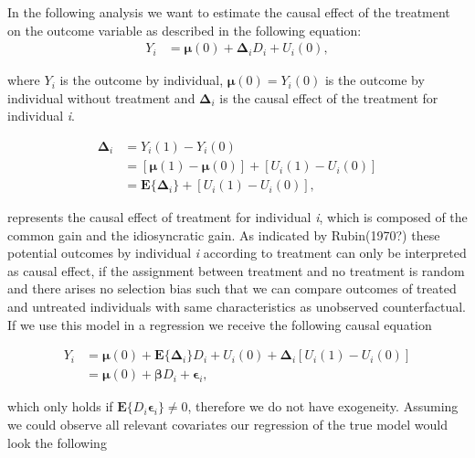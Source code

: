 In the following analysis we want to estimate the causal effect of the treatment on the outcome variable as described in the following equation: 
\begin{align}
	\label{eq:eq1}
	\textit{Y}_i &= \boldsymbol{\mu}(0) + \boldsymbol{\Delta}_i \textit{D}_i + \textit{U}_i(0),
\end{align}

where $\textit{Y}_i$ is the outcome by individual, $\boldsymbol{\mu}(0) = \textit{Y}_i(0)$ is the outcome by individual without treatment and $\boldsymbol{\Delta}_i$ is the causal effect of the treatment  for individual \textit{i}.

\begin{equation}
  \begin{aligned}
	\label{eq:eq2}
	\boldsymbol{\Delta}_i &= \textit{Y}_i(1) - \textit{Y}_i(0) \\
						 &= [\boldsymbol{\mu}(1)- \boldsymbol{\mu}(0)] + [\textit{U}_i(1)-\textit{U}_i(0)] \\
						 &= \boldsymbol{E} \{ \boldsymbol{\Delta}_i \} + [\textit{U}_i(1)-\textit{U}_i(0)],
  \end{aligned}
\end{equation}
  

represents the causal effect of treatment for individual \textit{i}, which is composed of the common gain and the idiosyncratic gain. As indicated by Rubin(1970?) these potential outcomes by individual \textit{i} according to treatment can only be interpreted as causal effect, if the assignment between treatment and no treatment is random and there arises no selection bias such that we can compare outcomes of treated and untreated individuals with same characteristics as unobserved counterfactual. If we use this model in a regression we receive the following causal equation

\begin{equation}
  \begin{aligned}
	\label{eq:eq3}
	\textit{Y}_i &= \boldsymbol{\mu}(0) + \boldsymbol{E} \{ \boldsymbol{\Delta}_i \} \textit{D}_i + \textit{U}_i(0) + \boldsymbol{\Delta}_i[\textit{U}_i(1)-\textit{U}_i(0)] \\
				 &= \boldsymbol{\mu}(0) + \boldsymbol{\beta} \textit{D}_i + \boldsymbol{\epsilon}_i,
  \end{aligned}
\end{equation}
  
which only holds if $\boldsymbol{E}\{\textit{D}_i\boldsymbol{\epsilon}_i\} \neq 0$, therefore we do not have exogeneity. Assuming we could observe all relevant covariates our regression of the true model would look the following

